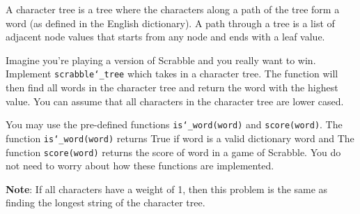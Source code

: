 \begin{blocksection}
\question A character tree is a tree where the characters along a path of the tree form a word (as defined in the English dictionary). A path through a tree is a list of adjacent node values that starts from any node and ends with a leaf value. 

Imagine you're playing a version of Scrabble and you really want to win. Implement \texttt{scrabble\char`_tree} which takes in a character tree. The function will then find all words in the character tree and return the word with the highest value. You can assume that all characters in the character tree are lower cased.

You may use the pre-defined functions \texttt{is\char`_word(word)} and \texttt{score(word)}. The function \texttt{is\char`_word(word)} returns True if word is a valid dictionary word and The function \texttt{score(word)} returns the score of word in a game of Scrabble. You do not need to worry about how these functions are implemented.

\textbf{Note}: If all characters have a weight of 1, then this problem is the same as finding the longest string of the character tree.
\end{blocksection}

